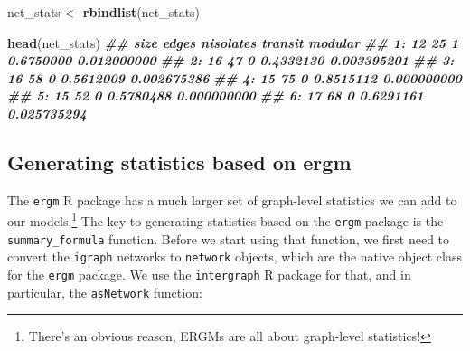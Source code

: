 \documentclass[
]{book}
\newenvironment{Shaded}{\begin{snugshade}}{\end{snugshade}}
\newcommand{\DocumentationTok}[1]{\textcolor[rgb]{0.56,0.35,0.01}{\textbf{\textit{#1}}}}
\newcommand{\FunctionTok}[1]{\textcolor[rgb]{0.13,0.29,0.53}{\textbf{#1}}}
\newcommand{\NormalTok}[1]{#1}
\newcommand{\OtherTok}[1]{\textcolor[rgb]{0.56,0.35,0.01}{#1}}
\begin{document}
\begin{Shaded}
\begin{Highlighting}[]
\NormalTok{net\_stats }\OtherTok{\textless{}{-}} \FunctionTok{rbindlist}\NormalTok{(net\_stats)}

\FunctionTok{head}\NormalTok{(net\_stats)}
\DocumentationTok{\#\#    size edges nisolates   transit     modular}
\DocumentationTok{\#\# 1:   12    25         1 0.6750000 0.012000000}
\DocumentationTok{\#\# 2:   16    47         0 0.4332130 0.003395201}
\DocumentationTok{\#\# 3:   16    58         0 0.5612009 0.002675386}
\DocumentationTok{\#\# 4:   15    75         0 0.8515112 0.000000000}
\DocumentationTok{\#\# 5:   15    52         0 0.5780488 0.000000000}
\DocumentationTok{\#\# 6:   17    68         0 0.6291161 0.025735294}
\end{Highlighting}
\end{Shaded}

\hypertarget{generating-statistics-based-on-ergm}{%
\subsection{Generating statistics based on ergm}\label{generating-statistics-based-on-ergm}}

The \texttt{ergm} R package has a much larger set of graph-level statistics we can add to our models.\footnote{There's an obvious reason, ERGMs are all about graph-level statistics!} The key to generating statistics based on the \texttt{ergm} package is the \texttt{summary\_formula} function. Before we start using that function, we first need to convert the \texttt{igraph} networks to \texttt{network} objects, which are the native object class for the \texttt{ergm} package. We use the \texttt{intergraph} R package for that, and in particular, the \texttt{asNetwork} function:
\end{document}
